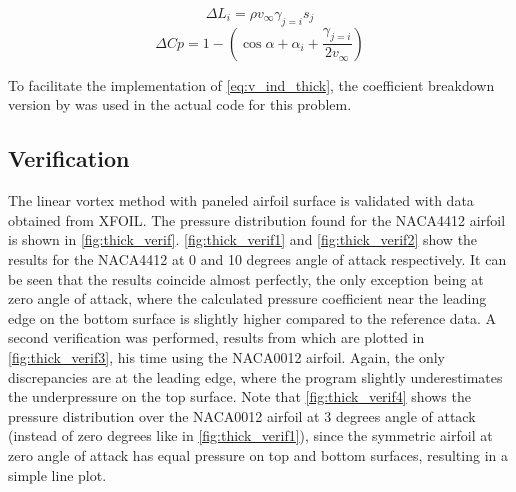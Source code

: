 \begin{equation}
\label{eq:thick_lift}
\Delta L_i = \rho v_\infty \gamma_{j=i} s_j
\end{equation}
\medskip
\begin{equation}
\label{eq:thick_press}
\Delta Cp = 1 - \left( \cos{\alpha+\alpha_i} + \frac{ \gamma_{j=i} }{ 2 v_\infty } \right)
\end{equation}
\medskip

To facilitate the implementation of \autoref{eq:v_ind_thick}, the coefficient
breakdown version by \citeauthor{kuethe_chow_1998} was used in the actual code
for this problem.

\subsection{Verification}
The linear vortex method with paneled airfoil surface is validated with data
obtained from XFOIL\cite{xfoil}. The pressure distribution found for the
NACA4412 airfoil is shown in \autoref{fig:thick_verif}.
\autoref{fig:thick_verif1} and \autoref{fig:thick_verif2} show the results for
the NACA4412 at 0 and 10 degrees angle of attack respectively. It can be seen
that the results coincide almost perfectly, the only exception being at zero
angle of attack, where the calculated pressure coefficient near the leading edge
on the bottom surface is slightly higher compared to the reference data. A
second verification was performed, results from which are plotted in
\autoref{fig:thick_verif3}, his time using the NACA0012 airfoil. Again, the
only discrepancies are at the leading edge, where the program slightly
underestimates the underpressure on the top surface. Note that
\autoref{fig:thick_verif4} shows the pressure distribution over the NACA0012
airfoil at 3 degrees angle of attack (instead of zero degrees like in
\autoref{fig:thick_verif1}), since the symmetric airfoil at zero angle of attack
has equal pressure on top and bottom surfaces, resulting in a simple line plot.


